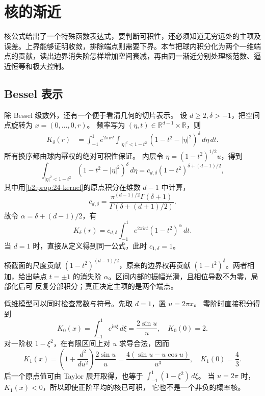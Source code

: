 \section{核的渐近}
\label{b2:sec:2402}

核公式给出了一个特殊函数表达式，要判断可积性，还必须知道无穷远处的主项及误差。上界能够证明收敛，排除端点则需要下界。本节把球内积分化为两个一维端点的贡献，读出边界消失阶怎样增加空间衰减，再由同一渐近分别处理核范数、逼近恒等和极大控制。

\subsection{Bessel 表示}
\label{b2:subsec:240201}

除 Bessel 级数外，还有一个便于看清几何的切片表示。
设 \(d\geq2,\delta>-1\)，把空间点旋转为 \(x=(0,\ldots,0,r)\)。
频率写为 \((\eta,t)\in\mathbb R^{d-1}\times\mathbb R\)，则
\[
 \begin{aligned}
 K_\delta(r)
 &=\int_{-1}^1e^{2\pi\mathrm i rt}
       \int_{|\eta|^2<1-t^2}
          (1-t^2-|\eta|^2)^\delta\,d\eta\,dt.
 \end{aligned}
\]
所有换序都由球内幂权的绝对可积性保证。
内层令 \(\eta=(1-t^2)^{1/2}u\)，得到
\[
 \int_{|\eta|^2<1-t^2}(1-t^2-|\eta|^2)^\delta\,d\eta
 =c_{d,\delta}(1-t^2)^{\delta+(d-1)/2},
\]
其中用\cref{b2:prop:24-kernel}的原点积分在维数 \(d-1\) 中计算，
\[
 c_{d,\delta}
 =\frac{\pi^{(d-1)/2}\Gamma(\delta+1)}
        {\Gamma(\delta+(d+1)/2)}.
\]
故令 \(\alpha=\delta+(d-1)/2\)，有
\[
 K_\delta(r)=c_{d,\delta}
       \int_{-1}^1e^{2\pi\mathrm i rt}(1-t^2)^\alpha\,dt.
\]
当 \(d=1\) 时，直接从定义得到同一公式，此时 \(c_{1,\delta}=1\)。

\ProseParagraphBreak
横截面的尺度贡献 \((1-t^2)^{(d-1)/2}\)，原来的边界权再贡献
\((1-t^2)^\delta\)。两者相加，给出端点 \(t=\pm1\) 的消失阶
\(\alpha\)。区间内部的振幅光滑，且相位导数不为零，局部化后可
反复分部积分；真正决定主项的是两个端点。

\ProseParagraphBreak
低维模型可以同时检查常数与符号。先取 \(d=1\)，置 \(u=2\pi x\)。
零阶时直接积分得到
\[
 K_0(x)=\int_{-1}^1e^{\mathrm i u\xi}\,d\xi
       =\frac{2\sin u}{u},\quad K_0(0)=2.
\]
对一阶权 \(1-\xi^2\)，在有限区间上对 \(u\) 求导合法，因而
\[
 K_1(x)=\left(1+\frac{d^2}{du^2}\right)
              \frac{2\sin u}{u}
       =\frac{4(\sin u-u\cos u)}{u^3},\quad K_1(0)=\frac43.
\]
后一个原点值可由 Taylor 展开取得，也等于
\(\int_{-1}^1(1-\xi^2)\,d\xi\)。
当 \(u=2\pi\) 时，\(K_1(x)<0\)，所以即使正阶平均的核已可积，
它也不是一个非负的概率核。

